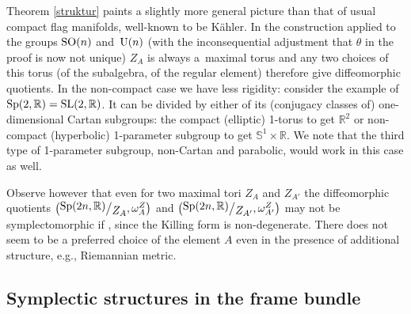 \documentclass[10pt,a4paper]{amsart}
\numberwithin{equation}{section}
\newcommand{\bigslant}[2]{{\raisebox{.2em}{$#1$}\big/\raisebox{-.2em}{$#2$}}}
\begin{document}
\begin{Remark} Theorem \ref{struktur} paints a slightly more general picture than that of usual compact flag manifolds, well-known to be K\"ahler. In the construction applied to the groups ${\rm SO}(n)$ and~${\rm U}(n)$ (with the inconsequential adjustment that $\theta$ in the proof is now not unique) $Z_A$ is always a~maximal torus and any two choices of this torus (of the subalgebra, of the regular element) therefore give diffeomorphic quotients. In the non-compact case we have less rigidity: consider the example of ${\rm Sp}(2,\mathbb{R})={\rm SL}(2,\mathbb{R})$. It can be divided by either of its (conjugacy classes of) one-dimensional Cartan subgroups: the compact (elliptic) 1-torus to get $\mathbb{R}^2$ or non-compact (hyperbolic) 1-parameter subgroup to get $\mathbb{S}^1\times \mathbb{R}$. We note that the third type of 1-parameter subgroup, non-Cartan and parabolic, would work in this case as well.
\end{Remark}
\begin{Remark} Observe however that even for two maximal tori $Z_A$ and $Z_{A'}$ the diffeomorphic quotients $\big(\bigslant{{\rm Sp}(2n,\mathbb{R})}{Z_A},\omega^{Z}_{A}\big)$ and $\big(\bigslant{{\rm Sp}(2n,\mathbb{R})}{Z_{A'}},\omega^{Z}_{A'}\big)$ may not be symplectomorphic if , since the Killing form is non-degenerate. There does not seem to be a preferred choice of the element $A$ even in the presence of additional structure, e.g., Riemannian metric.
\end{Remark}

\subsection{Symplectic structures in the frame bundle}
\end{document}
